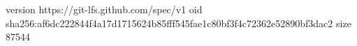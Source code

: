 version https://git-lfs.github.com/spec/v1
oid sha256:af6dc222844f4a17d1715624b85fff545fae1c80bf3f4c72362e52890bf3dac2
size 87544
